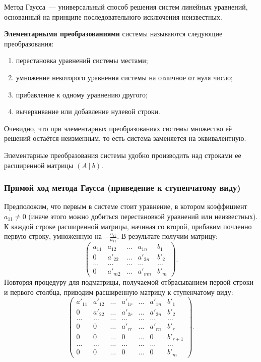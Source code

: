 \documentclass[10pt]{article}
\begin{document}
Метод Гаусса~--- универсальный способ решения систем линейных уравнений, основанный на принципе последовательного исключения неизвестных.

\begin{definition}
\textbf{Элементарными преобразованиями} системы называются следующие преобразования:
\begin{enumerate}
    \item перестановка уравнений системы местами;
    \item умножение некоторого уравнения системы на отличное от нуля число;
    \item прибавление к одному уравнению другого;
    \item вычеркивание или добавление нулевой строки.
\end{enumerate}
\end{definition}

Очевидно, что при элементарных преобразованиях системы множество её решений остаётся неизменным, то есть система заменяется на эквивалентную.

Элементарные преобразования системы удобно производить над строками ее расширенной матрицы \((A \: | \: b)\).

\subsubsection*{Прямой ход метода Гаусса (приведение к ступенчатому виду)}

Предположим, что первым в системе стоит уравнение, в котором коэффициент \(a_{11} \neq 0\) (иначе этого можно добиться перестановкой уравнений или неизвестных). К каждой строке расширенной матрицы, начиная со второй, прибавим почленно первую строку, умноженную на \(-\frac{a_{i1}}{a_{11}}\). В результате получим матрицу:
\[
\begin{pmatrix}
a_{11} & a_{12} & \dots & a_{1n} & b_1 \\
0 & a'_{22} & \dots & a'_{2n} & b'_2 \\
\dots & \dots & \dots & \dots & \dots \\
0 & a'_{m2} & \dots & a'_{mn} & b'_m
\end{pmatrix}.
\]
Повторяя процедуру для подматрицы, получаемой отбрасыванием первой строки и первого столбца, приводим расширенную матрицу к ступенчатому виду:
\[
\begin{pmatrix}
\boxed{a'_{11}} & a'_{12} & \dots & a'_{1r} & \dots & a'_{1n} & b'_1 \\
0 & \boxed{a'_{22}} & \dots & a'_{2r} & \dots & a'_{2n} & b'_2 \\
\dots & \dots & \dots & \dots & \dots & \dots & \dots \\
0 & 0 & \dots & \boxed{a'_{rr}} & \dots & a'_{rn} & b'_r \\
0 & 0 & \dots & 0 & \dots & 0 & b'_{r+1} \\
\dots & \dots & \dots & \dots & \dots & \dots & \dots \\
0 & 0 & \dots & 0 & \dots & 0 & b'_m
\end{pmatrix}.
\]
\end{document}
